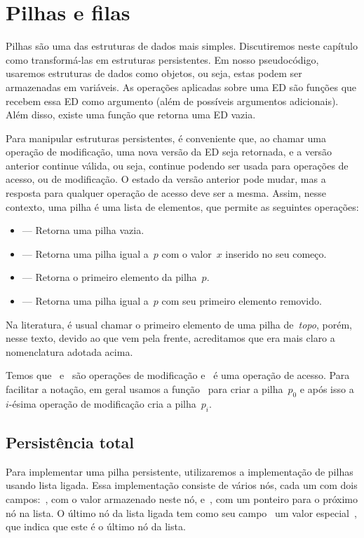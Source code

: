 \documentclass[main.tex]{subfiles}
\begin{document}
\chapter{Pilhas e filas} \label{cap:pilha_persist}
Pilhas são uma das estruturas de dados mais simples. Discutiremos neste capítulo como transformá-las em estruturas persistentes. Em nosso pseudocódigo, usaremos estruturas de dados como objetos, ou seja, estas podem ser armazenadas em variáveis. As operações aplicadas sobre uma ED são funções que recebem essa ED como argumento (além de possíveis argumentos adicionais). Além disso, existe uma função que retorna uma ED vazia.

Para manipular estruturas persistentes, é conveniente que, ao chamar uma operação de modificação, uma nova versão da ED seja retornada, e a versão anterior continue válida, ou seja, continue podendo ser usada para operações de acesso, ou de modificação. O estado da versão anterior pode mudar, mas a resposta para qualquer operação de acesso deve ser a mesma. Assim, nesse contexto, uma pilha é uma lista de elementos, que permite as seguintes operações:

\begin{itemize}
	\item {} --- Retorna uma pilha vazia.
	\item {} --- Retorna uma pilha igual a~$p$ com o valor~$x$ inserido no seu começo.
	\item {} --- Retorna o primeiro elemento da pilha~$p$.
	\item {} --- Retorna uma pilha igual a~$p$ com seu primeiro elemento removido.
\end{itemize}

Na literatura, é usual chamar o primeiro elemento de uma pilha de~\emph{topo}, porém, nesse texto, devido ao que vem pela frente, acreditamos que era mais claro a nomenclatura adotada acima.

Temos que~ e~ são operações de modificação e~ é uma operação de acesso. Para facilitar a notação, em geral usamos a função~ para criar a pilha~$p_0$ e após isso a~$i$-ésima operação de modificação cria a pilha~$p_i$.

\section{Persistência total}

Para implementar uma pilha persistente, utilizaremos a implementação de pilhas usando lista ligada. Essa implementação consiste de vários nós, cada um com dois campos:~, com o valor armazenado neste nó, e~, com um ponteiro para o próximo nó na lista. O último nó da lista ligada tem como seu campo~ um valor especial~, que indica que este é o último nó da lista.
\end{document}
